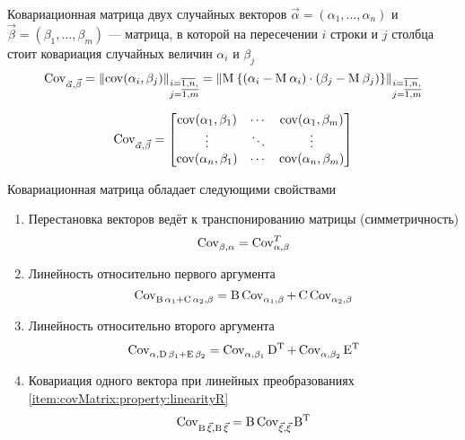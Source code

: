 \begin{definition}\label{def:covMatrix}
  Ковариационная матрица двух случайных векторов
  $\vec{\alpha} = \left( \alpha_1, \dots, \alpha_n \right)$ и
  $\vec{\beta} = \left( \beta_1, \dots, \beta_m \right)$ --- матрица,
  в которой на пересечении $i$ строки и $j$ столбца стоит ковариация случайных
  величин $\alpha_i$ и $\beta_j$
  $$\operatorname{Cov}^{}_{\vec{\alpha}, \vec{\beta}}
      = \left\| \operatorname{cov}\!\left( \alpha_i, \beta_j \right) \right\|_{
      \substack{i= \overline{1,n},\\j= \overline{1,m}}}
      = \left\| \operatorname{M}_{} 
      \left\{ \left( \alpha_i - \operatorname{M}_{} \alpha_i \right)
          \cdot \left( \beta_j - \operatorname{M}_{} \beta_j \right)
      \right\} \right\|_{
          \substack{i= \overline{1,n},\\j= \overline{1,m}}}$$

  $$\operatorname{Cov}^{}_{\vec{\alpha}, \vec{\beta}} =
  \begin{bmatrix}
      \operatorname{cov}\!\left( \alpha_1, \beta_1 \right) & \cdots & \operatorname{cov}\!\left( \alpha_1, \beta_m \right) \\
      \vdots & \ddots & \vdots \\
      \operatorname{cov}\!\left( \alpha_n, \beta_1 \right) & \cdots & \operatorname{cov}\!\left( \alpha_n, \beta_m \right)
  \end{bmatrix}$$
\end{definition}

\begin{theorem}\label{th:covMatrix:properties}
Ковариационная матрица обладает следующими свойствами
  \begin{enumerate}
    \item\label{item:covMatrix:property:transposition}
        Перестановка векторов ведёт к транспонированию матрицы (симметричность)
        $$\operatorname{Cov}^{}_{\beta, \alpha} = \operatorname{Cov}^{T}_{\alpha, \beta}$$
    \item\label{item:covMatrix:property:linearityL}
        Линейность относительно первого аргумента
        $$\operatorname{Cov}^{}_{\operatorname{B} \alpha_1 + \operatorname{C} \alpha_2, \beta}
        = \operatorname{B} \operatorname{Cov}^{}_{\alpha_1, \beta}
            + \operatorname{C}\operatorname{Cov}^{}_{\alpha_2, \beta}$$
    \item\label{item:covMatrix:property:linearityR}
        Линейность относительно второго аргумента
        $$\operatorname{Cov}^{}_{\alpha, \operatorname{D} \beta_1 + \operatorname{E} \beta_2}
        = \operatorname{Cov}^{}_{\alpha, \beta_1} \operatorname{D^T}
            + \operatorname{Cov}^{}_{\alpha, \beta_2} \operatorname{E^T}$$
    \item\label{item:covMatrix:property:operatorOut}
        Ковариация одного вектора при линейных преобразованиях
        \ref{item:covMatrix:property:linearityR}
        $$\operatorname{Cov}^{}_{\operatorname{B} \vec{\xi}, \operatorname{B} \vec{\xi}}
        = \operatorname{B} \operatorname{Cov}^{}_{\vec{\xi}, \vec{\xi}} \operatorname{B^T}$$
  \end{enumerate}
\end{theorem}



